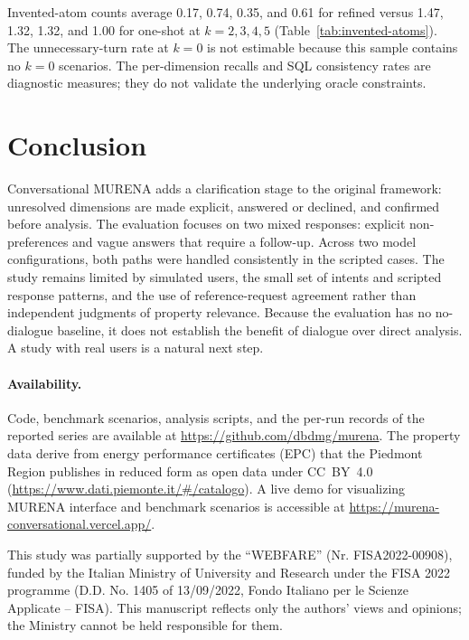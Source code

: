 \documentclass[sigconf,review]{acmart}
\begin{document}
Invented-atom counts average 0.17, 0.74, 0.35, and 0.61 for refined
versus 1.47, 1.32, 1.32, and 1.00 for one-shot at $k=2,3,4,5$
(Table~\ref{tab:invented-atoms}). The unnecessary-turn rate at $k=0$ is
not estimable because this sample contains no $k=0$ scenarios. The
per-dimension recalls and SQL consistency rates are diagnostic measures;
they do not validate the underlying oracle constraints.

\fi %
\fi %

\section{Conclusion}
\label{sec:conclusion}
Conversational MURENA adds a clarification stage to the original
framework: unresolved dimensions are made explicit, answered or declined,
and confirmed before analysis. The evaluation focuses on two mixed
responses: explicit non-preferences and vague answers that require a
follow-up. Across two model configurations, both paths were handled
consistently in the scripted cases. The study remains limited by simulated
users, the small set of intents and scripted response patterns, and the
use of reference-request agreement rather than independent judgments of
property relevance. Because the evaluation has no no-dialogue baseline,
it does not establish the benefit of dialogue over direct analysis. A
study with real users is a natural next step.

\paragraph{Availability.} Code, benchmark scenarios, analysis scripts,
and the per-run records of the reported series are available at
\url{https://github.com/dbdmg/murena}. The property data derive from
energy performance certificates (EPC) that the Piedmont Region publishes
in reduced form as open data under CC~BY~4.0
(\url{https://www.dati.piemonte.it/\#/catalogo}). A live demo for visualizing MURENA interface and benchmark scenarios is accessible at \url{https://murena-conversational.vercel.app/}.

\begin{acks}
This study was partially supported by the ``WEBFARE'' (Nr. FISA2022-00908), funded by the Italian Ministry of University and Research under the FISA 2022 programme (D.D. No. 1405 of 13/09/2022, Fondo Italiano per le Scienze Applicate -- FISA). This manuscript reflects only the authors' views and opinions; the Ministry cannot be held responsible for them.
\end{acks}



\end{document}
